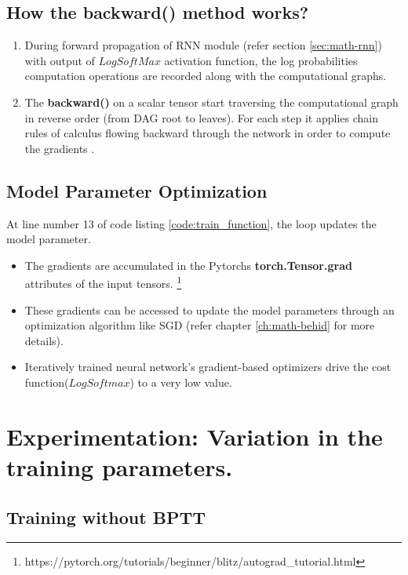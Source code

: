\subsection*{How the backward() method works?} \label{sec:backward}

\begin{enumerate}
    \item During forward propagation of \acs{RNN} module (refer section \ref{sec:math-rnn}) with output of $LogSoftMax$ activation function, the log probabilities computation operations are recorded along with the computational graphs.  
    \item The \textbf{backward()} on a scalar tensor start traversing the computational graph in reverse order (from \acs{DAG} root to leaves). For each step it applies chain rules of calculus flowing backward through the network in order to compute the gradients \parencite[section 6.5.2]{Goodfellow-et-al-2016}.

\end{enumerate}
\clearpage
\subsection{Model Parameter Optimization}
At line number 13 of code listing \ref{code:train_function}, the loop updates the model parameter.
\begin{itemize}
    \item  The gradients are accumulated in the Pytorchs  \textbf{torch.Tensor.grad} attributes of the input tensors. \footnote{https://pytorch.org/tutorials/beginner/blitz/autograd\_tutorial.html}
    \item These gradients can be accessed to update the model parameters through an optimization algorithm  like \acf{SGD} (refer chapter \ref{ch:math-behid} for more details).
    \item Iteratively trained neural network's  gradient-based optimizers drive the cost function($LogSoftmax$) to a very low value. 
\end{itemize}

\section{Experimentation: Variation in the training parameters.}

\subsection*{Training without \acs{BPTT}}

